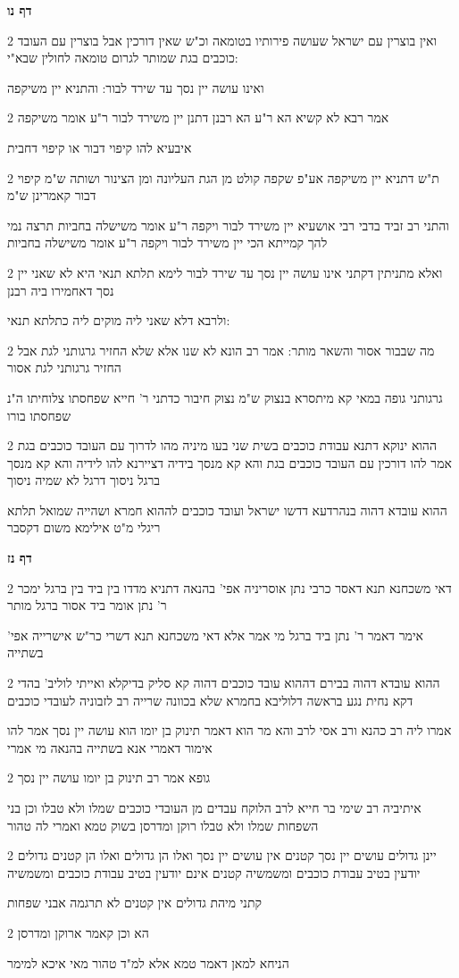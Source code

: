 \documentclass[12pt, openany]{book}
\newcommand{\sethebfont}{
\fontsize{10.5pt}{21.0pt} \selectfont
}
\newcommand{\twocol}[1]{
	{\sethebfont \begin{multicols}{2}
			#1
	\end{multicols}}	
}
\newcommand{\sectname}{}
\newcommand{\newsection}[1]{
	\addcontentsline{toc}{section}{#1}
	\renewcommand{\sectname}{#1}	
	\vspace{-\baselineskip}
	\begin{center}
		\textbf{%
\fontsize{16pt}{16pt}\selectfont
			#1}
	\end{center}
	\vspace{-\baselineskip}
	\nopagebreak
}
\begin{document}
\newsection{דף נו}
\twocol{ואין בוצרין עם ישראל שעושה פירותיו בטומאה וכ"ש שאין דורכין אבל בוצרין עם העובד כוכבים בגת שמותר לגרום טומאה לחולין שבא"י:
\par ואינו עושה יין נסך עד שירד לבור: והתניא יין משיקפה}
\twocol{אמר רבא לא קשיא הא ר"ע הא רבנן דתנן יין משירד לבור ר"ע אומר משיקפה
\par איבעיא להו קיפוי דבור או קיפוי דחבית}
\twocol{ת"ש דתניא יין משיקפה אע"פ שקפה קולט מן הגת העליונה ומן הצינור ושותה ש"מ קיפוי דבור קאמרינן ש"מ
\par והתני רב זביד בדבי רבי אושעיא יין משירד לבור ויקפה ר"ע אומר משישלה בחביות תרצה נמי להך קמייתא הכי יין משירד לבור ויקפה ר"ע אומר משישלה בחביות}
\twocol{ואלא מתניתין דקתני אינו עושה יין נסך עד שירד לבור לימא תלתא תנאי היא לא שאני יין נסך דאחמירו ביה רבנן
\par ולרבא דלא שאני ליה מוקים ליה כתלתא תנאי:}
\twocol{מה שבבור אסור והשאר מותר: אמר רב הונא לא שנו אלא שלא החזיר גרגותני לגת אבל החזיר גרגותני לגת אסור
\par גרגותני גופה במאי קא מיתסרא בנצוק ש"מ נצוק חיבור כדתני ר' חייא שפחסתו צלוחיתו ה"נ שפחסתו בורו}
\twocol{ההוא ינוקא דתנא עבודת כוכבים בשית שני בעו מיניה מהו לדרוך עם העובד כוכבים בגת אמר להו דורכין עם העובד כוכבים בגת והא קא מנסך בידיה דציירנא להו לידיה והא קא מנסך ברגל ניסוך דרגל לא שמיה ניסוך
\par ההוא עובדא דהוה בנהרדעא דדשו ישראל ועובד כוכבים לההוא חמרא ושהייה שמואל תלתא ריגלי מ"ט אילימא משום דקסבר}
\newsection{דף נז}
\twocol{דאי משכחנא תנא דאסר כרבי נתן אוסריניה אפי' בהנאה דתניא מדדו בין ביד בין ברגל ימכר ר' נתן אומר ביד אסור ברגל מותר
\par אימר דאמר ר' נתן ביד ברגל מי אמר אלא דאי משכחנא תנא דשרי כר"ש אישרייה אפי' בשתייה}
\twocol{ההוא עובדא דהוה בבירם דההוא עובד כוכבים דהוה קא סליק בדיקלא ואייתי לוליב' בהדי דקא נחית נגע בראשה דלוליבא בחמרא שלא בכוונה שרייה רב לזבוניה לעובדי כוכבים
\par אמרו ליה רב כהנא ורב אסי לרב והא מר הוא דאמר תינוק בן יומו הוא עושה יין נסך אמר להו אימור דאמרי אנא בשתייה בהנאה מי אמרי}
\twocol{גופא אמר רב תינוק בן יומו עושה יין נסך
\par איתיביה רב שימי בר חייא לרב הלוקח עבדים מן העובדי כוכבים שמלו ולא טבלו וכן בני השפחות שמלו ולא טבלו רוקן ומדרסן בשוק טמא ואמרי לה טהור}
\twocol{יינן גדולים עושים יין נסך קטנים אין עושים יין נסך ואלו הן גדולים ואלו הן קטנים גדולים יודעין בטיב עבודת כוכבים ומשמשיה קטנים אינם יודעין בטיב עבודת כוכבים ומשמשיה
\par קתני מיהת גדולים אין קטנים לא תרגמה אבני שפחות}
\twocol{הא וכן קאמר ארוקן ומדרסן
\par הניחא למאן דאמר טמא אלא למ"ד טהור מאי איכא למימר}
\end{document}
